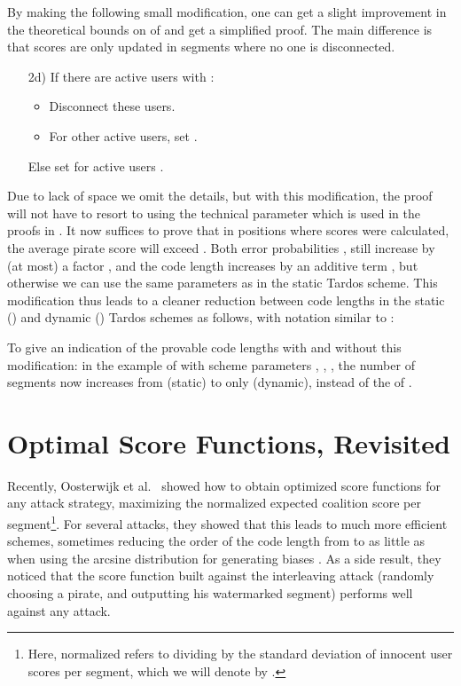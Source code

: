 \documentclass[10pt,a4paper,twocolumn]{article}
\begin{document}
By making the following small modification, one can get a slight improvement in the theoretical bounds on  of \cite{laarhoven13tit} and get a simplified proof. The main difference is that scores are only updated in segments where no one is disconnected.

\begin{enumerate}
	\item[2d)] If there are active users with :
	\begin{itemize}
		\item Disconnect these users. 
		\item For other active users, set .
	\end{itemize}
	\hspace{0.7cm}Else set  for active users . 
\end{enumerate}

Due to lack of space we omit the details, but with this modification, the proof will not have to resort to using the technical parameter  which is used in the proofs in \cite{laarhoven13tit}. It now suffices to prove that in positions where scores were calculated, the average pirate score will exceed . Both error probabilities ,  still increase by (at most) a factor , and the code length increases by an additive term , but otherwise we can use the same parameters as in the static Tardos scheme. This modification thus leads to a cleaner reduction between code lengths in the static () and dynamic () Tardos schemes as follows, with notation similar to \cite{laarhoven12wifs}:

To give an indication of the provable code lengths with and without this modification: in the example of \cite{laarhoven13tit} with scheme parameters , , , the number of segments now increases from  (static) to only  (dynamic), instead of the  of \cite{laarhoven13tit}.




\section{Optimal Score Functions, Revisited}
\label{sec:scores}

Recently, Oosterwijk et al.~\cite{oosterwijk13} showed how to obtain optimized score functions for any attack strategy, maximizing the normalized expected coalition score  per segment\footnote{Here, normalized refers to dividing by the standard deviation of innocent user scores per segment, which we will denote by .}. For several attacks, they showed that this leads to much more efficient schemes, sometimes reducing the order of the code length from  to as little as  when using the arcsine distribution for generating biases . As a side result, they noticed that the score function built against the interleaving attack (randomly choosing a pirate, and outputting his watermarked segment) performs well against any attack. 
\end{document}
